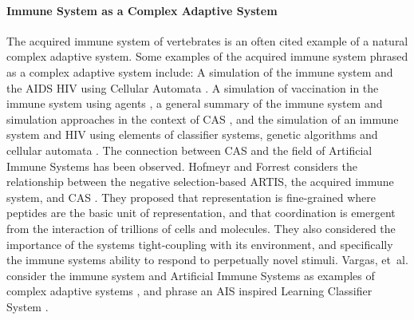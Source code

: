 %
%
\paragraph{Immune System as a Complex Adaptive System}
The acquired immune system of vertebrates is an often cited example of a natural complex adaptive system. Some examples of the acquired immune system phrased as a complex adaptive system include: A simulation of the immune system and the AIDS HIV using Cellular Automata  \cite{Grilo2002}. A simulation of vaccination in the immune system using agents \cite{Ahmed2005}, a general summary of the immune system and simulation approaches in the context of CAS \cite{Ahmed2006}, and the simulation of an immune system and HIV using elements of classifier systems, genetic algorithms and cellular automata \cite{Tay2005}. The connection between CAS and the field of Artificial Immune Systems has been observed. Hofmeyr and Forrest considers the relationship between the negative selection-based ARTIS, the acquired immune system, and CAS \cite{Hofmeyr2000}. They proposed that representation is fine-grained where peptides are the basic unit of representation, and that coordination is emergent from the interaction of trillions of cells and molecules. They also considered the importance of the systems tight-coupling with its environment, and specifically the immune systems ability to respond to perpetually novel stimuli. Vargas, et~al. consider the immune system and Artificial Immune Systems as examples of complex adaptive systems \cite{Vargas2002}, and phrase an AIS inspired Learning Classifier System \cite{Vargas2003, Vargas2003a}. 

